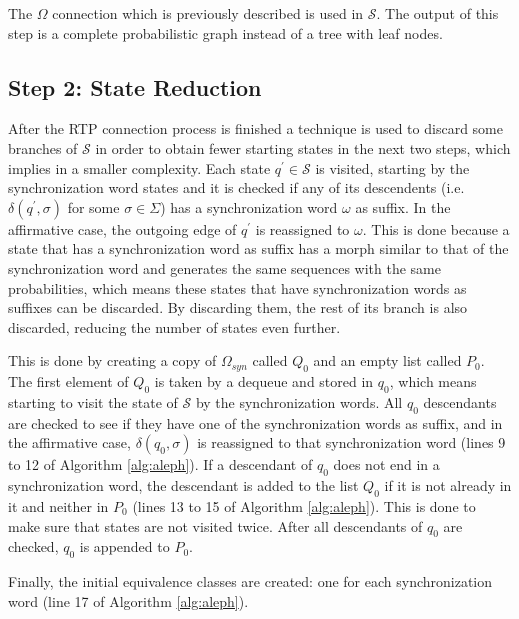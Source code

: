 {%

The $\Omega$ connection which is previously described is used in $\mathcal{S}$. The output of this step is a complete probabilistic graph instead of a tree with leaf nodes.

\subsection{Step 2: State Reduction}

 After the RTP connection process is finished a technique is used to discard some branches of $\mathcal{S}$ in order to obtain fewer starting states in the next two steps, which implies in a smaller complexity. Each state $q^{\prime}\in\mathcal{S}$ is visited, starting by the synchronization word states and it is checked if any of its descendents (i.e. $\delta(q^{\prime},\sigma)$ for some $\sigma \in \Sigma$) has a synchronization word $\omega$ as suffix. In the affirmative case, the outgoing edge of $q^{\prime}$ is reassigned to $\omega$. This is done because a state that has a synchronization word as suffix has a morph similar to that of the synchronization word and generates the same sequences with the same probabilities, which means these states that have synchronization words as suffixes can be discarded. By discarding them, the rest of its branch is also discarded, reducing the number of states even further. 

This is done by creating a copy of $\Omega_{syn}$ called $Q_0$ and an empty list called $P_0$. The first element of $Q_0$ is taken by a dequeue and stored in $q_0$, which means starting to visit the state of $\mathcal{S}$ by the synchronization words. All $q_0$ descendants are checked to see if they have one of the synchronization words as suffix, and in the affirmative case, $\delta(q_0,\sigma)$ is reassigned to that synchronization word (lines 9 to 12 of Algorithm \ref{alg:aleph}). If a descendant of $q_0$ does not end in a synchronization word, the descendant is added to the list $Q_0$ if it is not already in it and neither in $P_0$ (lines 13 to 15 of Algorithm \ref{alg:aleph}). This is done to make sure that states are not visited twice. After all descendants of $q_0$ are checked, $q_0$ is appended to $P_0$.

Finally, the initial equivalence classes are created: one for each synchronization word (line 17 of Algorithm \ref{alg:aleph}).

}
